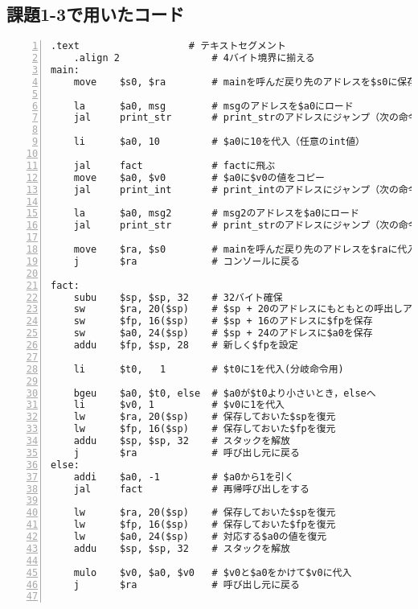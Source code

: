 \subsection{課題1-3で用いたコード} \label{sec:p1-3}
\begin{Verbatim}[numbers=left, xleftmargin=10mm, numbersep=6pt,
                    fontsize=\small, baselinestretch=0.8]
    .text                   # テキストセグメント
    .align 2                # 4バイト境界に揃える
main:
    move    $s0, $ra        # mainを呼んだ戻り先のアドレスを$s0に保存しておく

    la      $a0, msg        # msgのアドレスを$a0にロード
    jal     print_str       # print_strのアドレスにジャンプ（次の命令のアドレスを$raに）

    li      $a0, 10         # $a0に10を代入（任意のint値）

    jal     fact            # factに飛ぶ
    move    $a0, $v0        # $a0に$v0の値をコピー
    jal     print_int       # print_intのアドレスにジャンプ（次の命令のアドレスを$raに）

    la      $a0, msg2       # msg2のアドレスを$a0にロード
    jal     print_str       # print_strのアドレスにジャンプ（次の命令のアドレスを$raに）

    move    $ra, $s0        # mainを呼んだ戻り先のアドレスを$raに代入
    j       $ra             # コンソールに戻る

fact:
    subu    $sp, $sp, 32    # 32バイト確保
    sw      $ra, 20($sp)    # $sp + 20のアドレスにもともとの呼出しアドレスを保存
    sw      $fp, 16($sp)    # $sp + 16のアドレスに$fpを保存
    sw      $a0, 24($sp)    # $sp + 24のアドレスに$a0を保存
    addu    $fp, $sp, 28    # 新しく$fpを設定

    li      $t0,   1        # $t0に1を代入(分岐命令用)

    bgeu    $a0, $t0, else  # $a0が$t0より小さいとき，elseへ
    li      $v0, 1          # $v0に1を代入
    lw      $ra, 20($sp)    # 保存しておいた$spを復元
    lw      $fp, 16($sp)    # 保存しておいた$fpを復元
    addu    $sp, $sp, 32    # スタックを解放
    j       $ra             # 呼び出し元に戻る
else:
    addi    $a0, -1         # $a0から1を引く
    jal     fact            # 再帰呼び出しをする

    lw      $ra, 20($sp)    # 保存しておいた$spを復元
    lw      $fp, 16($sp)    # 保存しておいた$fpを復元
    lw      $a0, 24($sp)    # 対応する$a0の値を復元
    addu    $sp, $sp, 32    # スタックを解放

    mulo    $v0, $a0, $v0   # $v0と$a0をかけて$v0に代入
    j       $ra             # 呼び出し元に戻る


\end{Verbatim}
